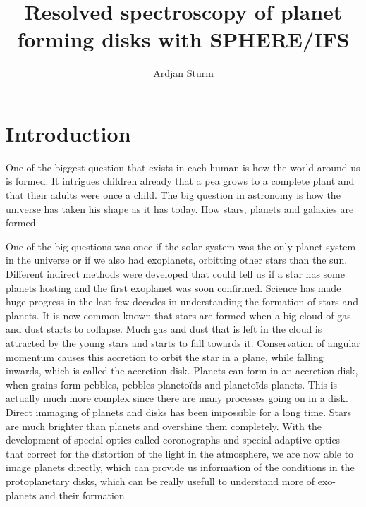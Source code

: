 \documentclass[twoside,single]{lion-msc}
\title{Resolved spectroscopy of planet forming disks with SPHERE/IFS}
\author{Ardjan Sturm}
\affiliation{Huygens-Kamerlingh Onnes Laboratory, Leiden University}   %
\begin{document}

\maketitle

\tableofcontents
\cleardoublepage



\chapter{Introduction}
One of the biggest question that exists in each human is how the world around us is formed. It intrigues children already that a pea grows to a complete plant and that their adults were once a child. The big question in astronomy is how the universe has taken his shape as it has today. How stars, planets and galaxies are formed.
\bigskip

One of the big questions was once if the solar system was the only planet system in the universe or if we also had exoplanets, orbitting other stars than the sun. Different indirect methods were developed that could tell us if a star has some planets hosting and the first exoplanet was soon confirmed. Science has made huge progress in the last few decades in understanding the formation of stars and planets. It is now common known that stars are formed when a big cloud of gas and dust starts to collapse. Much gas and dust that is left in the cloud is attracted by the young stars and starts to fall towards it. Conservation of angular momentum causes this accretion to orbit the star in a plane, while falling inwards, which is called the accretion disk. Planets can form in an accretion disk, when grains form pebbles, pebbles planeto\"ids and planeto\"ids planets. This is actually much more complex since there are many processes going on in a disk. Direct immaging of planets and disks has been impossible for a long time. Stars are much brighter than planets and overshine them completely. With the development of special optics called coronographs and special adaptive optics that correct for the distortion of the light in the atmosphere, we are now able to image planets directly, which can provide us information of the conditions in the protoplanetary disks, which can be really usefull to understand more of exo-planets and their formation.
\bigskip
\end{document}
